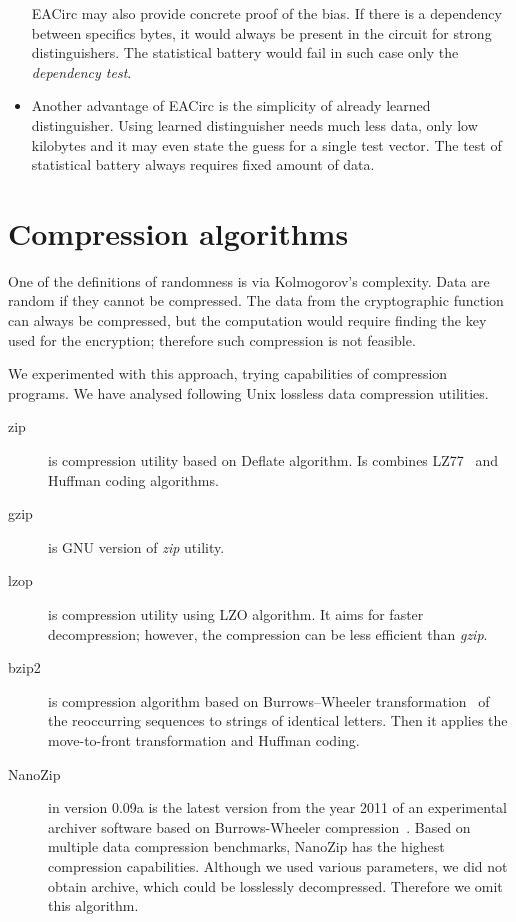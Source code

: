 \documentclass[
  print, %
  Table,   %
  nolof,     %
  nolot,     %
  11pt, %
  oneside  %
]{fithesis3}
\begin{document}
\begin{itemize}
    EACirc may also provide concrete proof of the bias. If there is a dependency between specifics bytes, it would always be present in the circuit for strong distinguishers. The statistical battery would fail in such case only the \textit{dependency test}.
    \item Another advantage of EACirc is the simplicity of already learned distinguisher. Using learned distinguisher needs much less data, only low kilobytes and it may even state the guess for a single test vector. The test of statistical battery always requires fixed amount of data.
\end{itemize}

\section{Compression algorithms}
\label{sec:relatwork-compress}

One of the definitions of randomness is via Kolmogorov's complexity. Data are random if they cannot be compressed. The data from the cryptographic function can always be compressed, but the computation would require finding the key used for the encryption; therefore such compression is not feasible.

We experimented with this approach, trying capabilities of compression programs. We have analysed following Unix lossless data compression utilities.

\begin{description}
    \item[zip] is compression utility based on Deflate algorithm. Is combines LZ77~\cite{ziv1977universal} and Huffman coding algorithms.
    \item[gzip] is GNU version of \textit{zip} utility.
    \item[lzop] is compression utility using LZO algorithm. It aims for faster decompression; however, the compression can be less efficient than \textit{gzip}.
    \item[bzip2] is compression algorithm based on Burrows–Wheeler transformation~\cite{burrows1994block} of the reoccurring sequences to strings of identical letters. Then it applies the move-to-front transformation and Huffman coding. 
    \item[NanoZip] in version 0.09a is the latest version from the year 2011 of an experimental archiver software based on Burrows-Wheeler compression~\cite{nanozip}. Based on multiple data compression benchmarks, NanoZip has the highest compression capabilities. Although we used various parameters, we did not obtain archive, which could be losslessly decompressed. Therefore we omit this algorithm.
\end{description}
\end{document}

